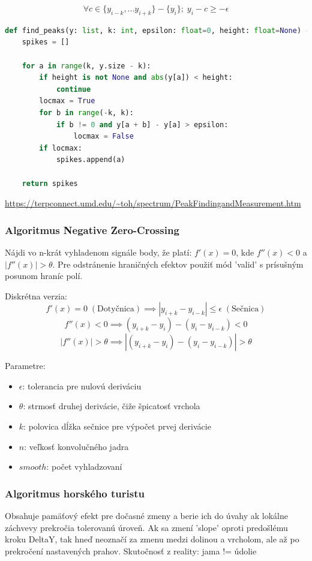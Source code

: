 \begin{equation}
\forall c \in \{y_{i-k}, ... y_{i+k}\} - \{y_i\}; \; y_i - c \geq -\epsilon
\end{equation}

\begin{lstlisting}[language=Python]
def find_peaks(y: list, k: int, epsilon: float=0, height: float=None) -> list:
    spikes = []
    
    for a in range(k, y.size - k): 
        if height is not None and abs(y[a]) < height:
            continue
        locmax = True
        for b in range(-k, k):
            if b != 0 and y[a + b] - y[a] > epsilon:
                locmax = False
        if locmax:
            spikes.append(a)

    return spikes
\end{lstlisting}
\url{https://terpconnect.umd.edu/~toh/spectrum/PeakFindingandMeasurement.htm}

\subsubsection{Algoritmus Negative Zero-Crossing}
Nájdi vo n-krát vyhladenom signále body, že platí: $f'(x) = 0$, kde $f''(x) < 0$ a $|f''(x)| > \theta$. Pre odstránenie hraničných efektov použiť mód 'valid' s prísušným posunom hraníc polí.

Diskrétna verzia:
$$f'(x) = 0 \; \mathrm{(Dotyčnica)} \implies |y_{i+k} - y_{i-k}| \leq \epsilon \;\mathrm{(Sečnica)}$$
$$f''(x) < 0 \implies (y_{i+k} - y_i) - (y_i - y_{i-k}) < 0$$
$$|f''(x)| > \theta \implies |(y_{i+k} - y_i) - (y_i - y_{i-k})| > \theta$$

Parametre: 
\begin{itemize}
\item $\epsilon$: tolerancia pre nulovú deriváciu
\item $\theta$: strmosť druhej derivácie, čiže špicatosť vrchola
\item $k$: polovica dĺžka sečnice pre výpočet prvej derivácie
\item $n$: veľkosť konvolučného jadra
\item $smooth$: počet vyhladzovaní
\end{itemize}

\subsubsection{Algoritmus horského turistu}
Obsahuje pamäťový efekt pre dočasné zmeny a berie ich do úvahy ak lokálne záchvevy prekročia tolerovanú úroveň. Ak sa zmení 'slope' oproti predošlému kroku DeltaY, tak hneď neoznačí za zmenu medzi dolinou a vrcholom, ale až po prekročení nastavených prahov. Skutočnosť z reality: jama != údolie


